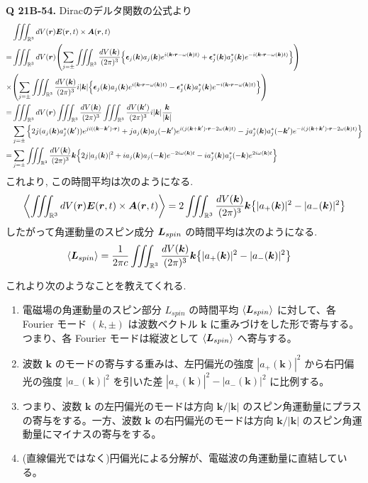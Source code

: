 \documentclass[uplatex,dvipdfmx,a4paper,11pt]{jlreq}
\newcommand{\RR}{\mathbb{R}}
\newcommand{\EE}{\bm{E}}
\renewcommand{\AA}{\bm{A}}
\newcommand{\rr}{\bm{r}}
\newcommand{\kk}{\bm{k}}
\theoremstyle{definition}
\begin{document}
\textbf{Q 21B-54.}
Diracのデルタ関数の公式より
\begin{align}
         & \iiint_{\RR^3}dV(\rr)\EE(\rr, t)\times\AA(\rr, t)                                                                                                                                                                    \\
  =      & \iiint_{\RR^3}dV(\rr)\qty(\sum_{j=\pm}\iiint_{\RR^3}\frac{dV(\kk)}{(2\pi)^3}\qty{\ee_j(\kk)a_j(\kk)e^{\ii(\kk\vdot\rr - \omega(\kk)t)} + \ee_j^*(\kk)a_j^*(\kk)e^{-\ii(\kk\vdot\rr - \omega(\kk)t)}})                \\
  \times & \qty(\sum_{j=\pm}\iiint_{\RR^3}\frac{dV(\kk)}{(2\pi)^3}\ii|\kk|\qty{\ee_j(\kk)a_j(\kk)e^{\ii(\kk\vdot\rr - \omega(\kk)t)} - \ee_j^*(\kk)a_j^*(\kk)e^{-\ii(\kk\vdot\rr - \omega(\kk)t)}})                             \\
  =      & \iiint_{\RR^3}dV(\rr)\iiint_{\RR^3}\frac{dV(\kk)}{(2\pi)^3}\iiint_{\RR^3}\frac{dV(\kk')}{(2\pi)^3}\ii|\kk|\frac{\kk}{|\kk|}                                                                                          \\
         & \sum_{j=\pm}\qty{2j(a_j(\kk)a_j^*(\kk'))e^{j\ii((\kk - \kk')\vdot\rr)} + ja_j(\kk)a_j(-\kk')e^{\ii(j(\kk + \kk')\vdot\rr - 2\omega(\kk)t)} - ja_j^*(\kk)a_j^*(-\kk')e^{-\ii(j(\kk + \kk')\vdot\rr - 2\omega(\kk)t)}} \\
  =      & \sum_{j=\pm}\iiint_{\RR^3}\frac{dV(\kk)}{(2\pi)^3}\kk\qty{2j|a_j(\kk)|^2 + \ii a_j(\kk)a_j(-\kk)e^{-2\ii\omega(\kk)t} - \ii a_j^*(\kk)a_j^*(-\kk)e^{2\ii\omega(\kk)t}}
\end{align}
これより, この時間平均は次のようになる.
\begin{align}
  \left\langle\iiint_{\RR^3}dV(\rr)\EE(\rr, t)\times\AA(\rr, t)\right\rangle = 2\iiint_{\RR^3}\frac{dV(\kk)}{(2\pi)^3}\kk\qty{|a_+(\kk)|^2 - |a_-(\kk)|^2}
\end{align}
したがって角運動量のスピン成分 $\bm{L}_{spin}$ の時間平均は次のようになる.
\begin{align}
  \langle\LL_{spin}\rangle & = \frac{1}{2\pi c}\iiint_{\RR^3}\frac{dV(\kk)}{(2\pi)^3}\kk\qty{|a_+(\kk)|^2 - |a_-(\kk)|^2}
\end{align}

これより次のようなことを教えてくれる.
\begin{enumerate}
  \item 電磁場の角運動量のスピン部分 $L_{spin}$ の時間平均 $\langle\bm{L}_{spin}\rangle$ に対して、各 Fourier モード $(k, \pm)$ は波数ベクトル $\kk$ に重みづけをした形で寄与する。つまり、各 Fourier モードは縦波として $\langle\bm{L}_{spin}\rangle$ へ寄与する。
  \item 波数 $\kk$ のモードの寄与する重みは、左円偏光の強度 $|a_+(\kk)|^2$ から右円偏光の強度 $|a_-(\kk)|^2$ を引いた差 $|a_+(\kk)|^2 - |a_-(\kk)|^2$ に比例する。
  \item つまり、波数 $\kk$ の左円偏光のモードは方向 $\kk/|\kk|$ のスピン角運動量にプラスの寄与をする。一方、波数 $\kk$ の右円偏光のモードは方向 $\kk/|\kk|$ のスピン角運動量にマイナスの寄与をする。
  \item (直線偏光ではなく)円偏光による分解が、電磁波の角運動量に直結している。
\end{enumerate}
\end{document}

